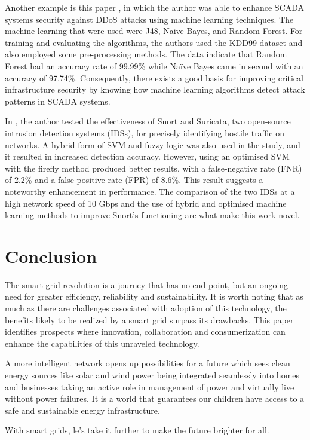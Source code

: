 Another example is this paper \cite{related3}, in which the author was able to enhance SCADA systems security against DDoS attacks using machine learning techniques. The machine learning that were used were J48, Naive Bayes, and Random Forest. For training and evaluating the algorithms, the authors used the KDD99 dataset and also employed some pre-processing methods. The data indicate that Random Forest had an accuracy rate of 99.99\% while Naïve Bayes came in second with an accuracy of 97.74\%. Consequently, there exists a good basis for improving critical infrastructure security by knowing how machine learning algorithms detect attack patterns in SCADA systems.





In \cite{related4}, the author tested the effectiveness of Snort and Suricata, two open-source intrusion detection systems (IDSs), for precisely identifying hostile traffic on networks. A hybrid form of SVM and fuzzy logic was also used in the study, and it resulted in increased detection accuracy. However, using an optimised SVM with the firefly method produced better results, with a false-negative rate (FNR) of 2.2\% and a false-positive rate (FPR) of 8.6\%. This result suggests a noteworthy enhancement in performance. The comparison of the two IDSs at a high network speed of 10 Gbps and the use of hybrid and optimised machine learning methods to improve Snort's functioning are what make this work novel.









\newpage


\section{Conclusion}
The smart grid revolution is a journey that has no end point, but an ongoing need for greater efficiency, reliability and sustainability. It is worth noting that as much as there are challenges associated with adoption of this technology, the benefits likely to be realized by a smart grid surpass its drawbacks. This paper identifies prospects where innovation, collaboration and consumerization can enhance the capabilities of this unraveled technology.

A more intelligent network opens up possibilities for a future which sees clean energy sources like solar and wind power being integrated seamlessly into homes and businesses taking an active role in management of power and virtually live without power failures. It is a world that guarantees our children have access to a safe and sustainable energy infrastructure.

With smart grids, le's take it further to make the future brighter for all.